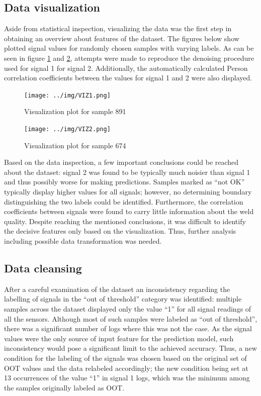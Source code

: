 \documentclass[12pt]{report}
\begin{document}
\subsection{Data visualization}
Aside from statistical inspection, visualizing the data was the first step in obtaining an overview about features of the dataset. The figures below show plotted signal values for randomly chosen samples with varying labels. As can be seen in figure \ref{fig:VIZ1} and \ref{fig:VIZ2}, attempts were made to reproduce the denoising procedure used for signal 1 for signal 2. Additionally, the automatically calculated Person correlation coefficients between the values for signal 1 and 2 were also displayed.

\begin{figure}[H]
	\centering
	\texttt{[image: ../img/VIZ1.png]}
	\caption{Visualization plot for sample 891}
	\label{fig:VIZ1}
\end{figure}
\begin{figure}[H]
	\centering
	\texttt{[image: ../img/VIZ2.png]}
	\caption{Visualization plot for sample 674}
	\label{fig:VIZ2}
\end{figure}


Based on the data inspection, a few important conclusions could be reached about the dataset: signal 2 was found to be typically much noisier than signal 1 and thus possibly worse for making predictions. Samples marked as “not OK” typically display higher values for all signals; however, no determining boundary distinguishing the two labels could be identified. Furthermore, the correlation coefficients between signals were found to carry little information about the weld quality. Despite reaching the mentioned conclusions, it was difficult to identify the decisive features only based on the visualization. Thus, further analysis including possible data transformation was needed.
\subsection{Data cleansing}
After a careful examination of the dataset an inconsistency regarding the labelling of signals in the “out of threshold” category was identified: multiple samples across the dataset displayed only the value “1” for all signal readings of all the sensors. Although most of such samples were labeled as “out of threshold”, there was a significant number of logs where this was not the case. As the signal values were the only source of input feature for the prediction model, such inconsistency would pose a significant limit to the achieved accuracy. Thus, a new condition for the labeling of the signals was chosen based on the original set of OOT values and the data relabeled accordingly; the new condition being set at 13 occurrences of the value “1” in signal 1 logs, which was the minimum among the samples originally labeled as OOT.
\end{document}
